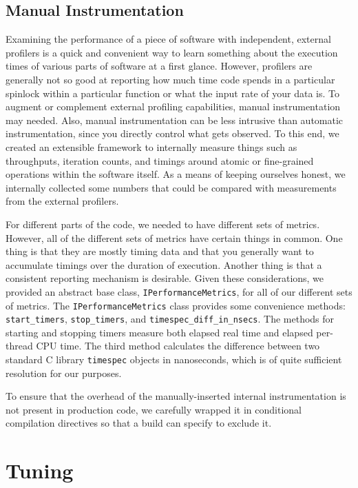 \documentclass{article}
\begin{document}
\subsection{Manual Instrumentation}

Examining the performance of a piece of software with independent, external
profilers is a quick and convenient way to learn something about the execution
times of various parts of software at a first glance. However, profilers are
generally not so good at reporting how much time code spends in a particular
spinlock within a particular function or what the input rate of your data is.
To augment or complement external profiling capabilities, manual
instrumentation may needed. Also, manual instrumentation can be less intrusive
than automatic instrumentation, since you directly control what gets observed.
To this end, we created an extensible framework to internally measure things
such as throughputs, iteration counts, and timings around atomic or
fine-grained operations within the software itself. As a means of keeping
ourselves honest, we internally collected some numbers that could be compared
with measurements from the external profilers.

For different parts of the code, we needed to have different sets of metrics.
However, all of the different sets of metrics have certain things in common.
One thing is that they are mostly timing data and that you generally want to
accumulate timings over the duration of execution. Another thing is that a
consistent reporting mechanism is desirable. Given these considerations, we
provided an abstract base class, \texttt{IPerformanceMetrics}, for all of our
different sets of metrics. The \texttt{IPerformanceMetrics} class provides some
convenience methods: \texttt{start\_timers}, \texttt{stop\_timers}, and
\texttt{timespec\_diff\_in\_nsecs}. The methods for starting and stopping
timers measure both elapsed real time and elapsed per-thread CPU time. The
third method calculates the difference between two standard C library
\texttt{timespec} objects in nanoseconds, which is of quite sufficient
resolution for our purposes.

To ensure that the overhead of the manually-inserted internal instrumentation
is not present in production code, we carefully wrapped it in conditional
compilation directives so that a build can specify to exclude it.

\section{Tuning}
\end{document}
